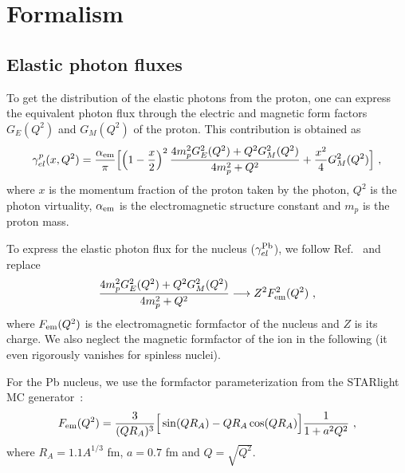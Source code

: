 \section{Formalism}

\subsection{Elastic photon fluxes}

To get the distribution of the elastic photons from the proton, one can express the equivalent photon flux through
the electric and magnetic form factors $G_E(Q^2)$ and $G_M(Q^2)$ of the proton.
This contribution is obtained as
\begin{eqnarray}
  \gamma^{p}_{el}(x,Q^2) = \frac{\alpha_{\rm{em}}}{\pi}
\Big[ \Big( 1- {x \over 2} \Big)^2 \, {4 m_p^2 G_E^2(Q^2) + Q^2 G_M^2(Q^2) \over 4m_p^2 + Q^2} + {x^2 \over 4} G_M^2(Q^2) \Big]~,
\label{proton_el_flux}
\end{eqnarray}
where $x$ is the momentum fraction of the proton taken by the photon, $Q^2$ is the photon virtuality, $\alpha_{\rm{em}}$ is the electromagnetic structure constant and $m_p$ is the proton mass.

To express the elastic photon flux for the nucleus ($\gamma^{\rm Pb}_{el}$), we follow Ref.~\cite{Budnev:1974de} and replace 
\begin{eqnarray}
 {4 m_p^2 G_E^2(Q^2) + Q^2 G_M^2(Q^2) \over 4m_p^2 + Q^2} \longrightarrow Z^2 F_{\rm em}^2(Q^2)~,
 \end{eqnarray}
where $F_{\rm em}(Q^2)$ is the electromagnetic formfactor of the nucleus and $Z$ is its charge.
We also neglect the magnetic formfactor of the ion in the following (it even rigorously vanishes for spinless nuclei).

For the Pb nucleus, we use the formfactor parameterization from the STARlight MC generator~\cite{Klein:2016yzr}:
\begin{eqnarray}
 F_{\rm em}(Q^2) = {3 \over (QR_A)^3}\Big[ \sin(QR_A) - QR_A \cos(QR_A) \Big] { 1 \over 1 + a^2 Q^2}~,
\end{eqnarray}
where $R_A = 1.1 A^{1/3}$ fm, $a = 0.7$ fm and $Q = \sqrt{Q^2}$.

